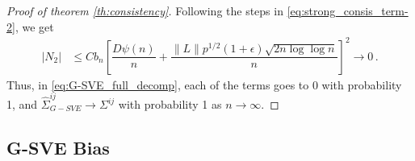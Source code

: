 \documentclass[11pt]{article}
\theoremstyle{remark}
\begin{document}
\begin{proof}[Proof of theorem \ref{th:consistency}]
%
Following the steps in \eqref{eq:strong_consis_term-2}, we get
\begin{align*}
    |N_2| & \leq Cb_n\left[ \dfrac{D \psi(n)}{n} + \dfrac{\|L\| p^{1/2}(1+\epsilon)\sqrt{2n \log\log n}}{n}  \right]^2  \to 0\,.
\end{align*}
Thus, in \eqref{eq:G-SVE_full_decomp}, each of the terms goes to 0 with probability 1, and $\hat{\Sigma}_{G-SVE}^{ij} \to \Sigma^{ij}$ with probability 1 as $n \to \infty$. 
\end{proof}









\subsection{G-SVE Bias}
\end{document}
